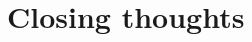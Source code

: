 \documentclass[11pt]{article} %
\begin{document}
\section{Closing thoughts}
\label{sec:summary}
 

 



\newpage 



\end{document}
